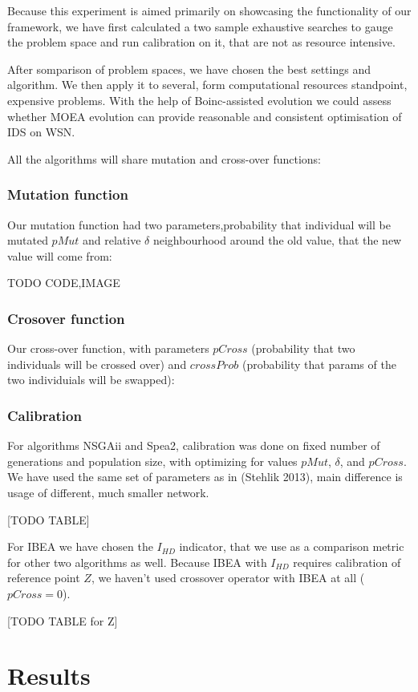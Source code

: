\documentclass[12pt,oneside,draft]{fithesis2}
\begin{document}
Because this experiment is aimed primarily on showcasing the functionality of our framework, 
we have first calculated a two sample exhaustive searches to gauge the problem space and run calibration on it, that are not as resource intensive.

After somparison of problem spaces, we have chosen the best settings and algorithm. We then apply it to several, form computational resources standpoint, expensive problems. With the help of Boinc-assisted evolution we could assess whether MOEA evolution can provide reasonable and consistent optimisation of IDS on WSN.

All the algorithms will share mutation and cross-over functions:

\subsubsection{Mutation function}
Our mutation function had two parameters,probability that individual will be mutated $pMut$ and relative $\delta$ neighbourhood around the old value, that the new value will come from:

TODO CODE,IMAGE

\subsubsection{Crosover function}
Our cross-over function, with parameters $pCross$ (probability that two individuals will be crossed over) and $crossProb$ (probability that params of the two individuials will be swapped):

\subsubsection{Calibration}

For algorithms NSGAii and Spea2, calibration was done on fixed number of generations and population size, with optimizing for values $pMut$, $\delta$, and $pCross$. We have used the same set of parameters as in (Stehlik 2013), main difference is usage of different, much smaller network.

[TODO TABLE]

For IBEA we have chosen the $I_{HD}$ indicator, that we use as a comparison metric for other two algorithms as well. Because IBEA with $I_{HD}$ requires calibration of reference point $Z$, we haven't used crossover operator with IBEA at all ($pCross=0$).

[TODO TABLE for Z]

\section{Results}



\end{document}
